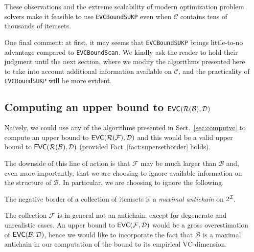These observations and the extreme scalability of modern optimization problem
solvers make it feasible to use \texttt{EVCBoundSUKP} even when $\mathcal{C}$
contains tens of thousands of itemsets.

One final comment: at first, it may seems that \texttt{EVCBoundSUKP} brings
little-to-no advantage compared to \texttt{EVCBoundScan}. We kindly ask the
reader to hold their judgment until the next section, where we modify the
algorithms presented here to take into account additional information available
on $\mathcal{C}$, and the practicality of \texttt{EVCBoundSUKP} will be more
evident.

\subsection{Computing an upper bound to $\mathsf{EVC}(\mathcal{R}(\mathcal{B}),{\cal D})$}
\label{sec:vcbupper}

Na\"ively, we
could use any of the algorithms presented in Sect.~\ref{sec:computvc} to compute
an upper bound to $\mathsf{EVC}(\mathcal{R}(\mathcal{F}),{\cal D})$ and this would be a valid upper bound
to $\mathsf{EVC}(\mathcal{R}(\mathcal{B}),{\cal D})$ (provided Fact~\ref{fact:supersetborder} holds).

The
downside of this line of action is that $\mathcal{F}$ may be much larger than
$\mathcal{B}$ and, even more importantly, that we are choosing to ignore
available information on the structure of $\mathcal{B}$. In particular, we are
choosing to ignore the following.

\begin{fact}
	The negative border of a collection of itemsets is a \emph{maximal
	antichain} on $2^{\cal I}$.
\end{fact}

The collection $\mathcal{F}$ is in general not an antichain, except for
degenerate and unrealistic cases. An upper bound to $\mathsf{EVC}(\mathcal{F},{\cal D})$
would be a gross overestimation of $\mathsf{EVC}(\mathcal{B},{\cal D})$, hence we would like
to incorporate the fact that $\mathcal{B}$ is a maximal antichain in our
computation of the bound to its empirical VC-dimension.

